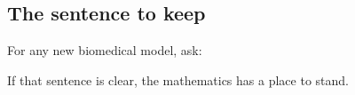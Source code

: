 \documentclass[a4paper]{article}
\begin{document}
\subsection{The sentence to keep}

For any new biomedical model, ask:
\begin{center}
\end{center}
If that sentence is clear, the mathematics has a place to stand.



\end{document}
